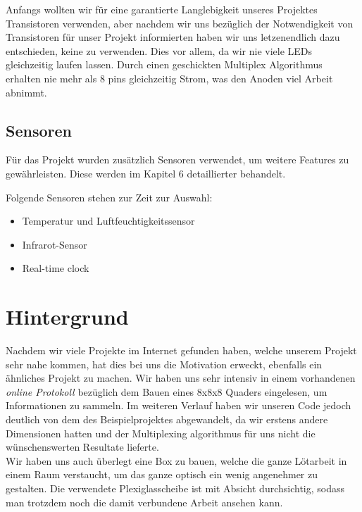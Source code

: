\documentclass[12pt,a4paper]{article}
\begin{document}
Anfangs wollten wir für eine garantierte Langlebigkeit unseres Projektes Transistoren verwenden, aber nachdem wir uns bezüglich der Notwendigkeit
von Transistoren für unser Projekt informierten haben wir uns letzenendlich dazu entschieden, keine zu verwenden. Dies vor allem, da wir nie viele LEDs gleichzeitig laufen lassen. Durch einen geschickten Multiplex Algorithmus erhalten nie mehr als 8 pins gleichzeitig Strom, was den Anoden viel Arbeit abnimmt.

\newpage

\subsection{Sensoren}

Für das Projekt wurden zusätzlich Sensoren verwendet, um weitere Features zu gewährleisten. Diese werden im Kapitel 6 detaillierter behandelt.

Folgende Sensoren stehen zur Zeit zur Auswahl:
\begin{itemize}
    \item Temperatur und Luftfeuchtigkeitssensor
    \item Infrarot-Sensor
    \item Real-time clock
\end{itemize}


\section{Hintergrund}

Nachdem wir viele Projekte im Internet gefunden haben, welche unserem Projekt sehr nahe kommen, 
hat dies bei uns die Motivation erweckt, ebenfalls ein ähnliches Projekt zu machen.
Wir haben uns sehr intensiv in einem vorhandenen \textit{online Protokoll} bezüglich dem Bauen eines 8x8x8 Quaders eingelesen, um Informationen zu sammeln\cite{RGB LED Cube}. Im weiteren Verlauf haben wir unseren Code jedoch deutlich von dem des Beispielprojektes abgewandelt, da wir erstens andere Dimensionen hatten und der Multiplexing algorithmus für uns nicht die wünschenswerten Resultate lieferte. \\
Wir haben uns auch überlegt eine Box zu bauen, welche die ganze Lötarbeit in einem Raum verstaucht, um das ganze optisch ein wenig angenehmer zu gestalten. Die verwendete Plexiglasscheibe ist mit Absicht durchsichtig, sodass man trotzdem noch die damit verbundene Arbeit ansehen kann.
\end{document}
